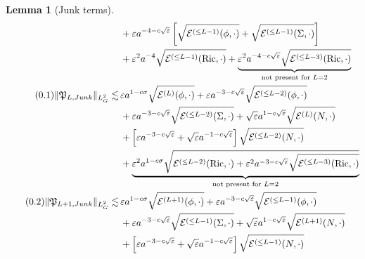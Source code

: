 \documentclass[11pt,leqno,textwidth=10cm]{amsart}
\numberwithin{equation}{section}
\theoremstyle{definition}
\theoremstyle{plain}
\newtheorem{lemma}[definition]{Lemma}
\newcommand{\1}{\mathbbm{1}}
\newcommand{\E}{\mathcal{E}}
\newcommand{\Ric}{\text{\normalfont{Ric}}}
\renewcommand{\epsilon}{\varepsilon}
\newcommand{\numberthis}{\addtocounter{equation}{1}\tag{\theequation}}
\renewcommand{\theequation}{\arabic{section}.\arabic{equation}}
\newcommand{\todo}[1]{\textcolor{red}{#1}}
\newcommand{\deletemath}[1]{}
\begin{document}
\begin{lemma}[Junk terms]
\begin{subequations}
\begin{align*}
&\,+\epsilon a^{-4-c\sqrt{\epsilon}}\left[\sqrt{\E^{(\leq L-1)}(\phi,\cdot)}+\sqrt{\E^{(\leq L-1)}(\Sigma,\cdot)}\right]\\
&\,+\epsilon^2a^{-4}\sqrt{\E^{(\leq L-1)}(\Ric,\cdot)}+\underbrace{\epsilon^2a^{-4-c\sqrt{\epsilon}}\sqrt{\E^{(\leq L-3)}(\Ric,\cdot)}}_{\text{not present for }L=2}\\
\numberthis\label{eq:L2-junk-P-even}\|\mathfrak{P}_{L,Junk}\|_{L^2_G}\lesssim&\,\epsilon a^{1-c\sigma}\sqrt{\E^{(L)}(\phi,\cdot)}+\epsilon a^{-3-c\sqrt{\epsilon}}\sqrt{\E^{(\leq L-2)}(\phi,\cdot)}\\
&\,+\epsilon a^{-3-c\sqrt{\epsilon}}\sqrt{\E^{(\leq L-2)}(\Sigma,\cdot)}+\sqrt{\epsilon}a^{1-c\sqrt{\epsilon}}\sqrt{\E^{(L)}(N,\cdot)}\\
&\,+\left[\epsilon a^{-3-c\sqrt{\epsilon}}+\sqrt{\epsilon}a^{-1-c\sqrt{\epsilon}}\right]\sqrt{\E^{(\leq L-2)}(N,\cdot)}\\
&\,+\underbrace{\epsilon^2a^{1-c\sigma}\sqrt{\E^{(\leq L-2)}(\Ric,\cdot)+\epsilon^2 a^{-3-c\sqrt{\epsilon}}\sqrt{\E^{(\leq L-3)}(\Ric,\cdot)}}%
}_{\text{not present for }L=2}\\
\numberthis\label{eq:L2-junk-P-odd}\|\mathfrak{P}_{L+1,Junk}\|_{L^2_G}\lesssim&\,\epsilon a^{1-c\sigma}\sqrt{\E^{(L+1)}(\phi,\cdot)}+\epsilon a^{-3-c\sqrt{\epsilon}}\sqrt{\E^{(\leq L-1)}(\phi,\cdot)}\deletemath{+\epsilon a^{-3-c\sqrt{\epsilon}}\|\nabla\phi\|_{H^{L-2}_G}}\\
&\,+\epsilon a^{-3-c\sqrt{\epsilon}}\sqrt{\E^{(\leq L-1)}(\Sigma,\cdot)}+\sqrt{\epsilon}a^{1-c\sqrt{\epsilon}}\sqrt{\E^{(L+1)}(N,\cdot)}\\
&\,+\left[\epsilon a^{-3-c\sqrt{\epsilon}}+\sqrt{\epsilon}a^{-1-c\sqrt{\epsilon}}\right]\sqrt{\E^{(\leq L-1)}(N,\cdot)}\\

\end{align*}
\end{subequations}
\end{lemma}
\end{document}
